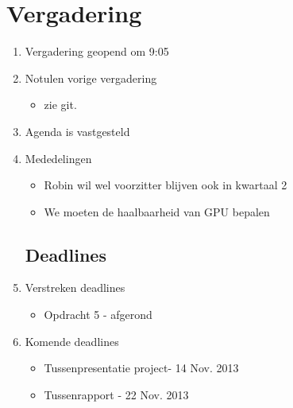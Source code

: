 \documentclass{article}
\begin{document}
\section*{Vergadering}
\begin{enumerate}
	
	\subsection*{Vooraf}
	\item Vergadering geopend om 9:05 %
	\item Notulen vorige vergadering
	\begin{itemize}
		\item zie git.
	\end{itemize}
	\item Agenda is vastgesteld
	\item Mededelingen
	\begin{itemize}
		\item Robin wil wel voorzitter blijven ook in kwartaal 2
		\item We moeten de haalbaarheid van GPU bepalen
	\end{itemize}

	\subsection*{Deadlines}
	\item Verstreken deadlines
	\begin{itemize}
		\item Opdracht 5 - afgerond
	\end{itemize}
	\item Komende deadlines
	\begin{itemize}
		\item Tussenpresentatie project- 14 Nov. 2013
		\item Tussenrapport - 22 Nov. 2013
	\end{itemize}

	


\end{enumerate}
\end{document}
